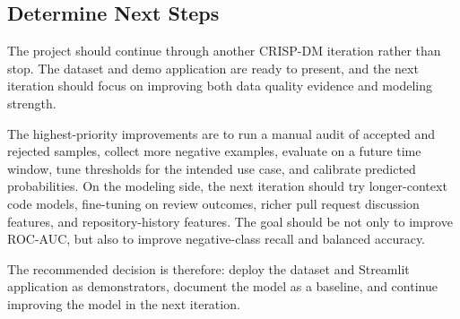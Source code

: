 \subsection{Determine Next Steps}

The project should continue through another CRISP-DM iteration rather than stop. The dataset and demo application are ready to present, and the next iteration should focus on improving both data quality evidence and modeling strength.

The highest-priority improvements are to run a manual audit of accepted and rejected samples, collect more negative examples, evaluate on a future time window, tune thresholds for the intended use case, and calibrate predicted probabilities. On the modeling side, the next iteration should try longer-context code models, fine-tuning on review outcomes, richer pull request discussion features, and repository-history features. The goal should be not only to improve ROC-AUC, but also to improve negative-class recall and balanced accuracy.

The recommended decision is therefore: deploy the dataset and Streamlit application as demonstrators, document the model as a baseline, and continue improving the model in the next iteration.
